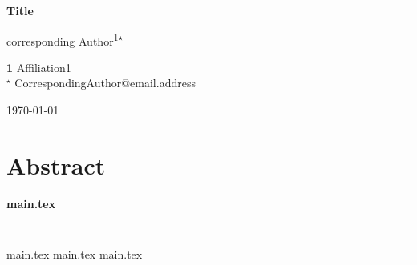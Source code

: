 \documentclass[submission, Phys]{SciPost}
\begin{document}
\begin{center}{\Large \textbf{
  Title
}}\end{center}

\begin{center}
corresponding Author\textsuperscript{1$\star$}
\end{center}

\begin{center}
{\bf 1} Affiliation1
\\
${}^\star$ {\small \sf CorrespondingAuthor@email.address}
\end{center}

\begin{center}
\today
\end{center}

\linenumbers

\section*{Abstract}
{\bf
  {main.tex}
}

\vspace{10pt}
\noindent\rule{\textwidth}{1pt}
\tableofcontents\thispagestyle{fancy}
\noindent\rule{\textwidth}{1pt}
\vspace{10pt}

{main.tex}
{main.tex}
{main.tex}




\nolinenumbers
\end{document}
